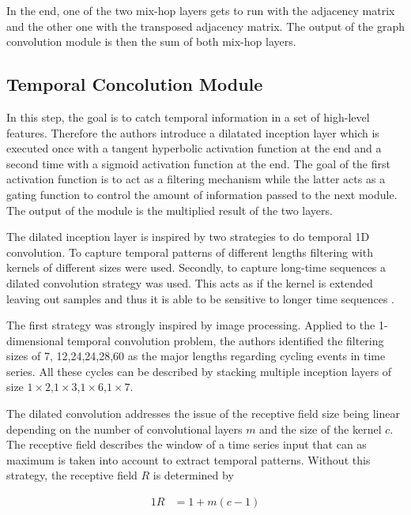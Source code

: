 \documentclass[letterpaper,twocolumn,11pt]{article}
\begin{document}
    In the end, one of the two mix-hop layers gets to run with the adjacency matrix and the other one with the transposed adjacency matrix.
    The output of the graph convolution module is then the sum of both mix-hop layers.

    \subsection{Temporal Concolution Module}
    In this step, the goal is to catch temporal information in a set of high-level features.
    Therefore the authors introduce a dilatated inception layer which is executed once with a tangent hyperbolic activation function at the end
    and a second time with a sigmoid activation function at the end.
    The goal of the first activation function is to act as a filtering mechanism while the latter acts as a gating function
    to control the amount of information passed to the next module.
    The output of the module is the multiplied result of the two layers.

    The dilated inception layer is inspired by two strategies to do temporal 1D convolution.
    To capture temporal patterns of different lengths filtering with kernels of different sizes were used.
    Secondly, to capture long-time sequences a dilated convolution strategy was used.
    This acts as if the kernel is extended leaving out samples and thus it is able to be sensitive to longer time sequences \cite{xi2018deep}.

    The first strategy was strongly inspired by image processing.
    Applied to the 1-dimensional temporal convolution problem, the authors identified the filtering sizes of 7, 12,24,24,28,60
    as the major lengths regarding cycling events in time series.
    All these cycles can be described by stacking multiple inception layers of size $1 \times 2$,$1 \times 3$,$1 \times 6$,$1 \times 7$.

    The dilated convolution addresses the issue of the receptive field size being linear depending on the number of convolutional layers $m$ and the size of the kernel $c$.
    The receptive field describes the window of a time series input that can as maximum is taken into account to extract temporal patterns.
    Without this strategy, the receptive field $R$ is determined by

    \begin{alignat}{1}
        R &= 1 + m(c-1)  \label{eq:receptive_field}
    \end{alignat}
\end{document}
